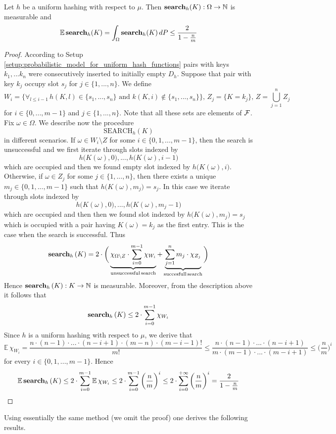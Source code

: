 \begin{theorem}\label{theorem:open_addressing_under_uniform_hashing_analysis_of_search}
Let $h$ be a uniform hashing with respect to $\mu$. Then $\mathbf{search}_h(K):\Omega \rightarrow {\mathbb N}$ is measurable and
$$\mathbb{E}\,\mathbf{search}_h(K) = \int_{\Omega}\mathbf{search}_h(K)\,dP \leq \frac{2}{1 - \frac{n}{m}}$$
\end{theorem}
\begin{proof}
According to Setup \ref{setup:probabilistic_model_for_uniform_hash_functions} pairs with keys $k_1,...k_n$ were consecutively inserted to initially empty $D_h$. Suppose that pair with key $k_j$ occupy slot $s_j$ for $j\in \{1,...,n\}$. We define
$$W_i = \big\{\forall_{l\leq i-1}\,h(K,l)\in \{s_1,...,s_n\}\mbox{ and }k(K,i) \not \in \{s_1,...,s_n\}\big\},\,Z_{j} = \big\{K = k_j\big\},\,Z = \bigcup_{j=1}^nZ_j$$
for $i\in \{0,...,m-1\}$ and $j\in \{1,...,n\}$. Note that all these sets are elements of ${\mathcal F}$. Fix $\omega \in \Omega$. We describe now the procedure
$$\mathrm{SEARCH}_h(K)$$
in different scenarios. If $\omega \in W_i\setminus Z$ for some $i\in \{0,1,...,m-1\}$, then the search is unsuccessful and we first iterate through slots indexed by
$$h\big(K(\omega),0\big),...,h\big(K(\omega), i-1\big)$$
which are occupied and then we found empty slot indexed by $h\big(K(\omega),i\big)$. Otherwise, if $\omega \in Z_j$ for some $j\in \{1,...,n\}$, then there exists a unique $m_j\in \{0,1,...,m-1\}$ such that $h\big(K(\omega),m_j\big) = s_j$. In this case we iterate through slots indexed by
$$h\big(K(\omega),0\big),...,h\big(K(\omega), m_j-1\big)$$
which are occupied and then then we found slot indexed by $h\big(K(\omega),m_j\big) = s_j$ which is occupied with a pair having $K(\omega) = k_j$ as the first entry. This is the case when the search is successful. Thus
$$\mathbf{search}_h\left(K\right) = 2 \cdot \bigg(\underbrace{\chi_{\Omega\setminus Z}\cdot\sum_{i=0}^{m-1} \chi_{W_{i}}}_{\mathrm{unsuccessful\,search}} + \underbrace{\sum_{j=1}^n m_j\cdot \chi_{Z_j}}_{\mathrm{succesfull\,search}}\bigg)$$
Hence $\mathbf{search}_h\left(K\right):K\rightarrow {\mathbb N}$ is measurable. Moreover, from the description above it follows that
$$\mathbf{search}_h\left(K\right) \leq 2 \cdot \sum_{i=0}^{m-1} \chi_{W_{i}}$$
Since $h$ is a uniform hashing with respect to $\mu$, we derive that
$$\mathbb{E}\,\chi_{W_{i}} = \frac{n\cdot (n-1)\cdot ...\cdot (n-i+1) \cdot (m-n) \cdot (m - i - 1)!}{m!} \leq \frac{n\cdot (n-1)\cdot ...\cdot (n- i + 1)}{m\cdot (m-1)\cdot ...\cdot (m - i + 1)}\leq \bigg(\frac{n}{m}\bigg)^i$$
for every $i\in \{0,1,...,m-1\}$. Hence
$$\mathbb{E}\,\mathbf{search}_h\left(K\right) \leq 2 \cdot \sum_{i=0}^{m-1} \mathbb{E}\,\chi_{W_{i}} \leq 2\cdot \sum_{i=0}^{m-1}\bigg(\frac{n}{m}\bigg)^i \leq 2\cdot \sum_{i=0}^{+\infty}\bigg(\frac{n}{m}\bigg)^i = \frac{2}{1 - \frac{n}{m}}$$ 
\end{proof}
\noindent
Using essentially the same method (we omit the proof) one derives the following results.

